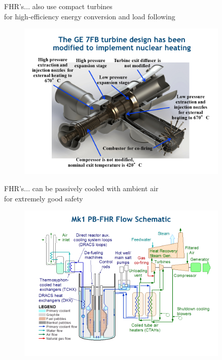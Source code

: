 \documentclass{beamer}
\begin{document}
        \begin{frame}{FHR's}{... also use compact turbines \\ for high-efficiency energy conversion and load following}
            \begin{figure}
                \centering
                \includegraphics[width=0.9\textwidth]{./img/fhrPower.png}
                \caption*{}
            \end{figure}
        \end{frame}

        \begin{frame}{FHR's}{... can be passively cooled with ambient air \\ for extremely good safety}
            \begin{figure}
                \centering
                \includegraphics[width=0.9\textwidth]{./img/fhrBop.png}
                \caption*{}
            \end{figure}
        \end{frame}
\end{document}
